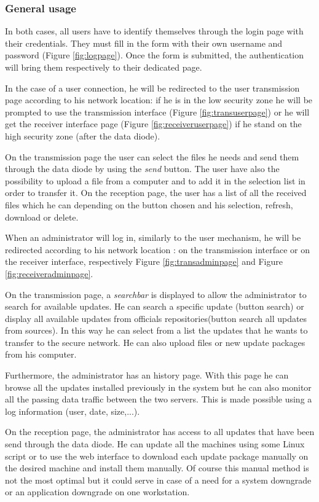 \documentclass[a4paper,10pt]{article}
\begin{document}
\subsubsection{General usage}
In both cases, all users have to identify themselves through the login page with their credentials. They must fill in the form with their own username and password (Figure \ref{fig:logpage}). Once the form is submitted, the authentication will bring them respectively to their dedicated page.\bigskip 

In the case of a user connection, he will be redirected to the user transmission page according to his network location: if he is in the low security zone he will be prompted to use the transmission interface (Figure \ref{fig:transuserpage}) or he will get the receiver interface page (Figure \ref{fig:receiveruserpage}) if he stand on the high security zone (after the data diode). 

On the transmission page the user can select the files he needs and send them through the data diode by using the \textit{send} button. The user have also the possibility to upload a file from a computer and to add it in the selection list in order to transfer it. On the reception page, the user has a list of all the received files which he can depending on the button chosen and his selection, refresh, download or delete.\bigskip 

When an administrator will log in, similarly to the user mechanism, he will be redirected according to his network location : on the transmission interface or on the receiver interface, respectively Figure \ref{fig:transadminpage} and Figure \ref{fig:receiveradminpage}.

On the transmission page, a \textit{searchbar} is displayed to allow the administrator to search for available updates. He can search a specific update (button search) or display all available updates from officials repositories(button search all updates from sources). In this way he can select from a list the updates that he wants to transfer to the secure network. He can also upload files or new update packages from his computer. 

Furthermore, the administrator has an history page. With this page he can browse all the updates installed previously in the system  but he can also monitor all the passing data traffic between the two servers. This is made possible using a log information (user, date, size,...).

On the reception page, the administrator has access to all updates that have been send through the data diode. He can update all the machines using some Linux script or to use the web interface to download each update package manually on the desired machine and install them manually. Of course this manual method is not the most optimal but it could serve in case of a need for a system downgrade or an application downgrade on one workstation.
\end{document}
